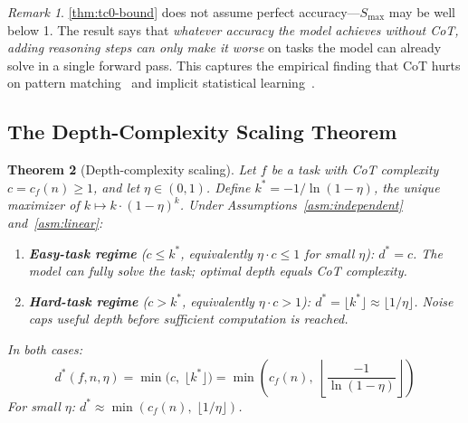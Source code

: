\documentclass{article}
\newtheorem{theorem}{Theorem}
\theoremstyle{definition}
\theoremstyle{remark}
\newtheorem{remark}[theorem]{Remark}
\newcommand{\depth}{d^*}       %
\newcommand{\noise}{\eta}      %
\newcommand{\ccot}{c}          %
\newcommand{\Smax}{S_{\max}}   %
\begin{document}
\begin{remark}
\cref{thm:tc0-bound} does not assume perfect accuracy---$\Smax$ may be well below 1. The result says that \emph{whatever accuracy the model achieves without CoT, adding reasoning steps can only make it worse} on tasks the model can already solve in a single forward pass. This captures the empirical finding that CoT hurts on pattern matching~\cite{zheng2025curse} and implicit statistical learning~\cite{liu2025mind}.
\end{remark}

\subsection{The Depth-Complexity Scaling Theorem}
\label{sec:scaling}

\begin{theorem}[Depth-complexity scaling]
\label{thm:scaling}
Let $f$ be a task with CoT complexity $c = \ccot_f(n) \geq 1$, and let $\noise \in (0, 1)$. Define $k^* = -1/\!\ln(1-\noise)$, the unique maximizer of $k \mapsto k \cdot (1 - \noise)^k$. Under Assumptions~\ref{asm:independent} and~\ref{asm:linear}:
\begin{enumerate}
\item[\emph{(a)}] \textbf{Easy-task regime} ($c \leq k^*$, equivalently $\noise \cdot c \leq 1$ for small $\noise$): $\depth = c$. The model can fully solve the task; optimal depth equals CoT complexity.
\item[\emph{(b)}] \textbf{Hard-task regime} ($c > k^*$, equivalently $\noise \cdot c > 1$): $\depth = \lfloor k^* \rfloor \approx \lfloor 1/\noise \rfloor$. Noise caps useful depth before sufficient computation is reached.
\end{enumerate}
In both cases:
\begin{equation}
\label{eq:main-result}
\depth(f, n, \noise) = \min\bigl(c,\; \lfloor k^* \rfloor\bigr) = \min\!\left(\ccot_f(n),\; \left\lfloor \frac{-1}{\ln(1 - \noise)} \right\rfloor\right)
\end{equation}
For small $\noise$: $\depth \approx \min(\ccot_f(n),\; \lfloor 1/\noise \rfloor)$.
\end{theorem}
\end{document}
